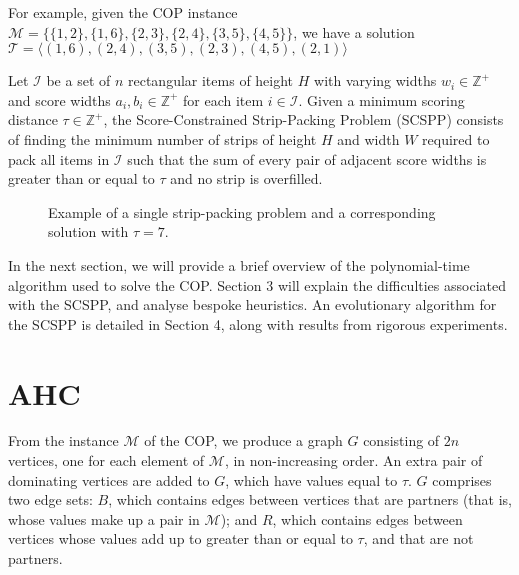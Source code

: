 \documentclass{elsarticle}
\begin{document}
For example, given the COP instance $\mathcal{M} = \{\{1,2\}, \{1,6\}, \{2,3\}, \{2,4\}, \{3,5\}, \{4,5\}\}$, we have a solution $\mathcal{T} = \langle(1,6), (2,4), (3,5), (2,3), (4,5), (2,1)\rangle$

\begin{definition}
	Let $\mathcal{I}$ be a set of $n$ rectangular items of height $H$ with varying widths $w_i \in \mathbb{Z}^+$ and score widths $a_i, b_i \in \mathbb{Z}^+$ for each item $i \in \mathcal{I}$. Given a minimum scoring distance $\tau \in \mathbb{Z}^+$, the Score-Constrained Strip-Packing Problem (SCSPP) consists of finding the minimum number of strips of height $H$ and width $W$ required to pack all items in $\mathcal{I}$ such that the sum of every pair of adjacent score widths is greater than or equal to $\tau$ and no strip is overfilled.
\end{definition}

\begin{figure}	
	\centering
	\begin{subfigure}[h]{0.45\textwidth}
		
		\label{fig:items}
	\end{subfigure} 
	\begin{subfigure}[h]{0.75\textwidth}
		
		\label{fig:itemsaligned}
	\end{subfigure}
	\caption{Example of a single strip-packing problem and a corresponding solution with $\tau = 7$.}
	\label{fig:items/aligned}
\end{figure}

In the next section, we will provide a brief overview of the polynomial-time algorithm used to solve the COP. Section 3 will explain the difficulties associated with the SCSPP, and analyse bespoke heuristics. An evolutionary algorithm for the SCSPP is detailed in Section 4, along with results from rigorous experiments.  

\section{AHC}

From the instance $\mathcal{M}$ of the COP, we produce a graph $G$ consisting of $2n$ vertices, one for each element of $\mathcal{M}$, in non-increasing order. An extra pair of dominating vertices are added to $G$, which have values equal to $\tau$. $G$ comprises two edge sets: $B$, which contains edges between vertices that are partners (that is, whose values make up a pair in $\mathcal{M}$); and $R$, which contains edges between vertices whose values add up to greater than or equal to $\tau$, and that are not partners.
\end{document}
